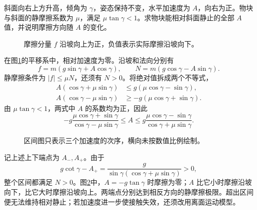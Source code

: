 \begin{exercise}[粗糙斜面的相对静止区间]\label{rot:problem-exercise-1}\label{rot:ex:d6-h1}
斜面向右上方升高，倾角为 $\gamma$，姿态保持不变，水平加速度为 $A$，向右为正。物块与斜面的静摩擦系数为 $\mu$，满足 $\mu\tan\gamma<1$。求物块能相对斜面静止的全部 $A$ 值，并说明摩擦方向随 $A$ 的变化。
\end{exercise}
\begin{figure}[H]\centering
{}
\caption{摩擦分量 $f$ 沿坡向上为正，负值表示实际摩擦沿坡向下。}\label{rot:fig:d6-h1-q}
\end{figure}
\begin{solution}
在图\ref{rot:fig:d6-h1-q}的平移系中，相对加速度为零。沿坡和法向分别有
\[
f=m(g\sin\gamma+A\cos\gamma),\qquad
N=m(g\cos\gamma-A\sin\gamma).
\]
静摩擦条件为 $|f|\le\mu N$，还须有 $N>0$。将绝对值拆成两个不等式，
\[
\begin{aligned}
A(\cos\gamma+\mu\sin\gamma)&\le g(\mu\cos\gamma-\sin\gamma),\\
A(\cos\gamma-\mu\sin\gamma)&\ge-g(\mu\cos\gamma+\sin\gamma).
\end{aligned}
\]
由 $\mu\tan\gamma<1$，两式中 $A$ 的系数均为正，因此
\[
\boxed{-g\frac{\mu\cos\gamma+\sin\gamma}{\cos\gamma-\mu\sin\gamma}
\le A\le
g\frac{\mu\cos\gamma-\sin\gamma}{\cos\gamma+\mu\sin\gamma}.}
\]
\begin{figure}[H]\centering
{}
\caption{区间图只表示三个加速度的次序，横向未按数值比例绘制。}\label{rot:fig:d6-h1-s}
\end{figure}
记上述上下端点为 $A_-,A_+$。由于
\[
g\cot\gamma-A_+
=\frac{g}{\sin\gamma(\cos\gamma+\mu\sin\gamma)}>0,
\]
整个区间都满足 $N>0$。图\ref{rot:fig:d6-h1-s}中，$A=-g\tan\gamma$ 时摩擦为零；$A$ 比它小时摩擦沿坡向下，比它大时摩擦沿坡向上。两端点分别达到相反方向的静摩擦极限。超出区间便无法维持相对静止；若加速度进一步使接触失效，还须改用离面运动模型。
\end{solution}



